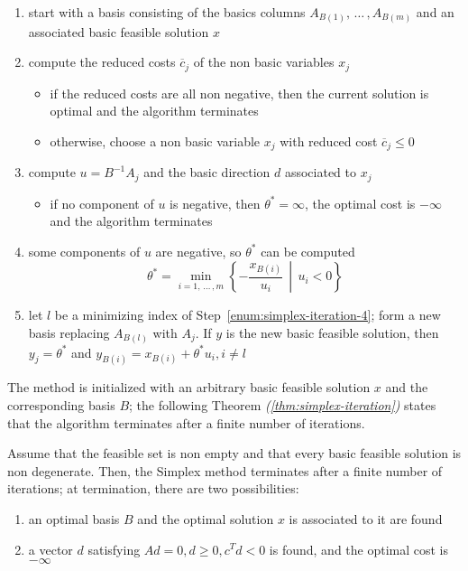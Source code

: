 \documentclass[english]{article}
\begin{document}
\begin{enumerate}[label=\arabic*., ref=(\arabic*)]
  \item \label{enum:simplex-iteration-1}start with a basis consisting of the basics columns \(A_{B(1)}, \, \ldots \,, A_{B(m)}\) and an associated basic feasible solution \(x\)
  \item \label{enum:simplex-iteration-2}compute the reduced costs \(\overline{c}_j\) of the non basic variables \(x_j\)
        \begin{itemize}[label=\(\rightarrow\)]
          \item if the reduced costs are all non negative, then the current solution is optimal and the algorithm terminates
          \item otherwise, choose a non basic variable \(x_j\) with reduced cost \(\overline{c}_j \leq 0\)
        \end{itemize}
  \item \label{enum:simplex-iteration-3}compute \(u = B^{-1} A_j\) and the basic direction \(d\) associated to \(x_j\)
        \begin{itemize}[label=\(\rightarrow\)]
          \item if no component of \(u\) is negative, then \(\theta^\ast = \infty\), the optimal cost is \(-\infty\) and the algorithm terminates
        \end{itemize}
  \item \label{enum:simplex-iteration-4}some components of \(u\) are negative, so \(\theta^\ast\) can be computed
        \[ \theta^\ast = \min_{i=1, \, \ldots \,, m} \left\{ - \dfrac{x_{B(i)}}{u_i} \,\middle\vert\, u_i < 0 \right\} \]
  \item \label{enum:simplex-iteration-5}let \(l\) be a minimizing index of Step~\ref{enum:simplex-iteration-4}; form a new basis replacing \(A_{B(l)}\) with \(A_j\).
        If \(y\) is the new basic feasible solution, then \(y_j = \theta^\ast\) and \(y_{B(i)} = x_{B(i)} + \theta^\ast u_i, i \neq l\)
\end{enumerate}

\bigskip
The method is initialized with an arbitrary basic feasible solution \(x\) and the corresponding basis \(B\);
the following Theorem \textit{(\ref{thm:simplex-iteration})} states that the algorithm terminates after a finite number of iterations.

\begin{theorem}
  Assume that the feasible set is non empty and that every basic feasible solution is non degenerate.
  Then, the Simplex method terminates after a finite number of iterations;
  at termination, there are two possibilities:
  \begin{enumerate}
    \item an optimal basis \(B\) and the optimal solution \(x\) is associated to it are found
    \item a vector \(d\) satisfying \(Ad = 0, d \geq 0, c^T d < 0\) is found, and the optimal cost is \(-\infty\)
  \end{enumerate}
  \label{thm:simplex-iteration}
\end{theorem}
\end{document}
